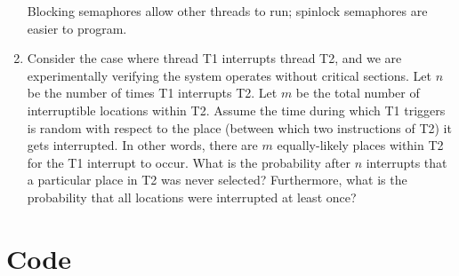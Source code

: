 \documentclass[12pt]{article}
\begin{document}
\begin{enumerate}[1)]
  Blocking semaphores allow other threads to run; spinlock semaphores
  are easier to program.
\item Consider the case where thread T1 interrupts thread T2, and we
  are experimentally verifying the system operates without critical
  sections. Let $n$ be the number of times T1 interrupts T2. Let $m$ be
  the total number of interruptible locations within T2. Assume the
  time during which T1 triggers is random with respect to the place
  (between which two instructions of T2) it gets interrupted. In other
  words, there are $m$ equally-likely places within T2 for the T1
  interrupt to occur. What is the probability after $n$ interrupts that
  a particular place in T2 was never selected? Furthermore, what is
  the probability that all locations were interrupted at least once? \\
\end{enumerate}

\section{Code}





\end{document}
